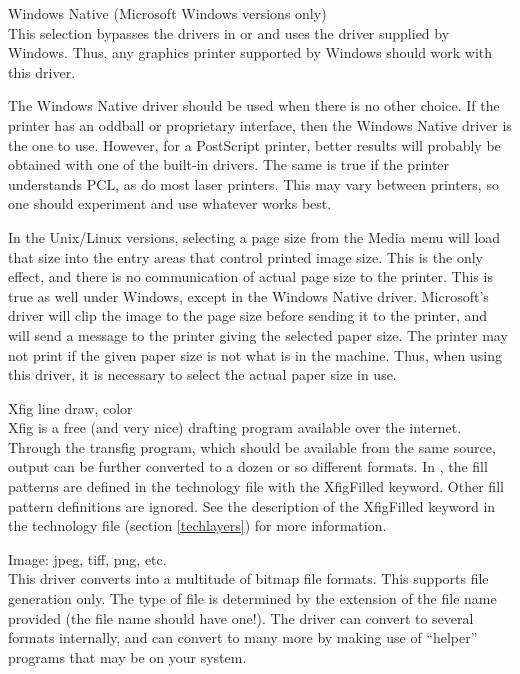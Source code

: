 \begin{description}
\item{\et Windows Native} (Microsoft Windows versions only)\\
This selection bypasses the drivers in {\Xic} or {\WRspice} and uses
the driver supplied by Windows.  Thus, any graphics printer supported
by Windows should work with this driver.

The {\et Windows Native} driver should be used when there is no other
choice.  If the printer has an oddball or proprietary interface, then
the {\et Windows Native} driver is the one to use.  However, for a
PostScript printer, better results will probably be obtained with one
of the built-in drivers.  The same is true if the printer understands
PCL, as do most laser printers.  This may vary between printers, so
one should experiment and use whatever works best.

In the Unix/Linux versions, selecting a page size from the {\cb Media}
menu will load that size into the entry areas that control printed
image size.  This is the only effect, and there is no communication of
actual page size to the printer.  This is true as well under Windows,
except in the {\et Windows Native} driver.  Microsoft's driver will
clip the image to the page size before sending it to the printer, and
will send a message to the printer giving the selected paper size. 
The printer may not print if the given paper size is not what is in
the machine.  Thus, when using this driver, it is necessary to select
the actual paper size in use.

\item{\et Xfig line draw, color}\\
{\et Xfig} is a free (and very nice) drafting program available over
the internet.  Through the {\vt transfig} program, which should be
available from the same source, output can be further converted to a
dozen or so different formats.  In {\Xic}, the fill patterns are
defined in the technology file with the {\vt XfigFilled} keyword. 
Other fill pattern definitions are ignored.  See the description of
the {\et XfigFilled} keyword in the technology file (section
\ref{techlayers}) for more information.

\item{\et Image: jpeg, tiff, png, etc.}\\
This driver converts into a multitude of bitmap file formats.  This
supports file generation only.  The type of file is determined by the
extension of the file name provided (the file name should have one!). 
The driver can convert to several formats internally, and can convert
to many more by making use of ``helper'' programs that may be on your
system.


\end{description}
